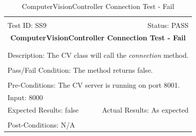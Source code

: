 \documentclass[11pt]{article}
\begin{document}
\begin{center}
\begin{table}[H]
\begin{tabular}{|l r|}\hline&\\[-2mm]
	Test ID: SS9	&Status: PASS\\[-3mm]
	\multicolumn{2}{|c|}{\textbf{\large{ComputerVisionController Connection Test - Fail}}}\\&\\\hline&\\[-3mm]
	\multicolumn{2}{|p{\textwidth}|}{Description: The CV class will call the \textit{connection} method.}\\[1mm]\hline&\\[-3mm]
	\multicolumn{2}{|p{\textwidth}|}{Pass/Fail Condition: The method returns false.}\\[1mm]\hline&\\[-3mm]
	\multicolumn{2}{|p{\textwidth}|}{Pre-Conditions: The CV server is running on port 8001.}\\[4mm]
	\multicolumn{2}{|p{\textwidth}|}{Input: 8000}\\[2mm]\hline
	\multicolumn{1}{|p{0.49\textwidth}}{Expected Results: false}	&\multicolumn{1}{|p{0.45\textwidth}|}{Actual Results: As expected}\\\hline&\\[-3mm]
	\multicolumn{2}{|p{\textwidth}|}{Post-Conditions: N/A}\\\hline
\end{tabular}
\caption{ComputerVisionController Connection Test - Fail}
\end{table}
\end{center}
\end{document}
